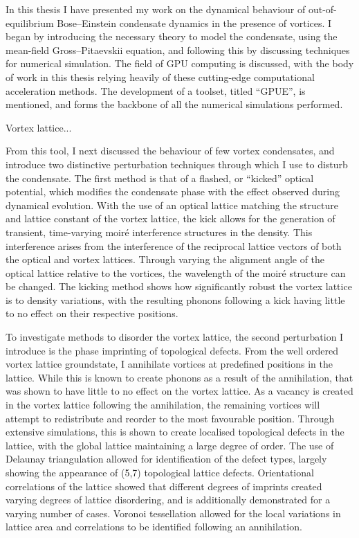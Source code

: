 In this thesis I have presented my work on the dynamical behaviour of out-of-equilibrium Bose--Einstein condensate dynamics in the presence of vortices. I began by introducing the necessary theory to model the condensate, using the mean-field Gross--Pitaevskii equation, and following this by discussing techniques for numerical simulation. The field of GPU computing is discussed, with the body of work in this thesis relying heavily of these cutting-edge computational acceleration methods. The development of a toolset, titled ``GPUE'', is mentioned, and forms the backbone of all the numerical simulations performed.

Vortex lattice...

From this tool, I next discussed the behaviour of few vortex condensates, and introduce two distinctive perturbation techniques through which I use to disturb the condensate. The first method is that of a flashed, or ``kicked'' optical potential, which modifies the condensate phase with the effect observed during dynamical evolution. With the use of an optical lattice matching the structure and lattice constant of the vortex lattice, the kick allows for the generation of transient, time-varying moir\'e interference structures in the density. This interference arises from the interference of the reciprocal lattice vectors of both the optical and vortex lattices. Through varying the alignment angle of the optical lattice relative to the vortices, the wavelength of the moir\'e structure can be changed. The kicking method shows how significantly robust the vortex lattice is to density variations, with the resulting phonons following a kick having little to no effect on their respective positions.


To investigate methods to disorder the vortex lattice, the second perturbation I introduce is the phase imprinting of topological defects. From the well ordered vortex lattice groundstate, I annihilate vortices at predefined positions in the lattice. While this is known to create phonons as a result of the annihilation, that was shown to have little to no effect on the vortex lattice. As a vacancy is created in the vortex lattice following the annihilation, the remaining vortices will attempt to redistribute and reorder to the most favourable position. Through extensive simulations, this is shown to create localised topological defects in the lattice, with the global lattice maintaining a large degree of order. The use of Delaunay triangulation allowed for identification of the defect types, largely showing the appearance of (5,7) topological lattice defects. Orientational correlations of the lattice showed that different degrees of imprints created varying degrees of lattice disordering, and is additionally demonstrated for a varying number of cases. Voronoi tessellation allowed for the local variations in lattice area and correlations to be identified following an annihilation.

